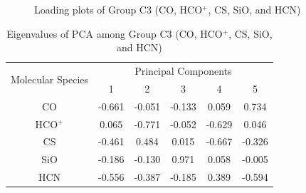 \documentclass{aa}
\begin{document}
\begin{CJK*}{UTF8}{gbsn}
    \begin{figure}[htbp]
        \centering  
        \caption{Loading plots of Group C3 (CO, HCO$^+$, CS, SiO, and HCN)}
        \label{Fig-5-loading}
    \end{figure}
   
    \begin{table}[htbp]
        \centering
        \begin{tabular}{cccccc}
        \hline\hline
        \multirow{2}{*}{Molecular Species} & \multicolumn{5}{c}{Principal Components}                 \\ \cline{2-6} 
                                           & 1       & 2       & 3       & 4       & 5 \\ \hline
        CO   & -0.661 & -0.051  & -0.133 & 0.059  & 0.734 \\ \hline
        HCO$^+$ & 0.065  & -0.771 & -0.052 & -0.629  & 0.046 \\ \hline
        CS   & -0.461 & 0.484  & 0.015   & -0.667 & -0.326\\ \hline
        SiO  & -0.186 & -0.130 & 0.971  & 0.058  & -0.005\\ \hline
        HCN  & -0.556 & -0.387 & -0.185 & 0.389  & -0.594\\ \hline\hline
        \end{tabular}
        \caption{Eigenvalues of PCA among Group C3 (CO, HCO$^+$, CS, SiO, and HCN)} 
        \label{table-5-eigen}
    \end{table}


\end{CJK*}
\end{document}
